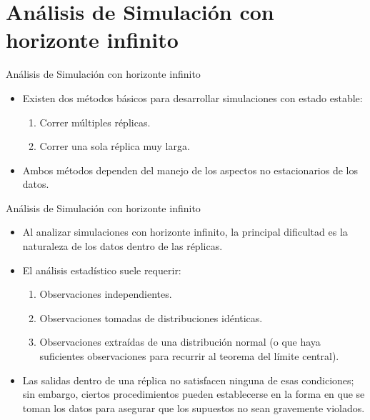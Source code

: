 \section[Horizonte infinito]{Análisis de Simulación con horizonte infinito}

\begin{frame}{Análisis de Simulación con horizonte infinito}
    \begin{itemize}
        \item Existen dos métodos básicos para desarrollar simulaciones con estado estable:
        \begin{enumerate}
            \item Correr múltiples réplicas. 
            \item Correr una sola réplica muy larga. 
        \end{enumerate}
        \item Ambos métodos dependen del manejo de los aspectos no estacionarios de los datos.
    \end{itemize}
\end{frame}

\begin{frame}{Análisis de Simulación con horizonte infinito}

    \begin{itemize}
        \item Al analizar simulaciones con horizonte infinito, la principal dificultad es la naturaleza de los datos dentro de las réplicas.
        \item El análisis estadístico suele requerir:
        \begin{enumerate}
            \item Observaciones independientes.
            \item Observaciones tomadas de distribuciones idénticas.
            \item Observaciones extraídas de una distribución normal (o que haya suficientes observaciones para recurrir al teorema del límite central).
        \end{enumerate}
        \item Las salidas dentro de una réplica no satisfacen ninguna de esas condiciones; sin embargo, ciertos procedimientos pueden establecerse en la forma en que se toman los datos para asegurar que los supuestos no sean gravemente violados.
    \end{itemize}
\end{frame}

